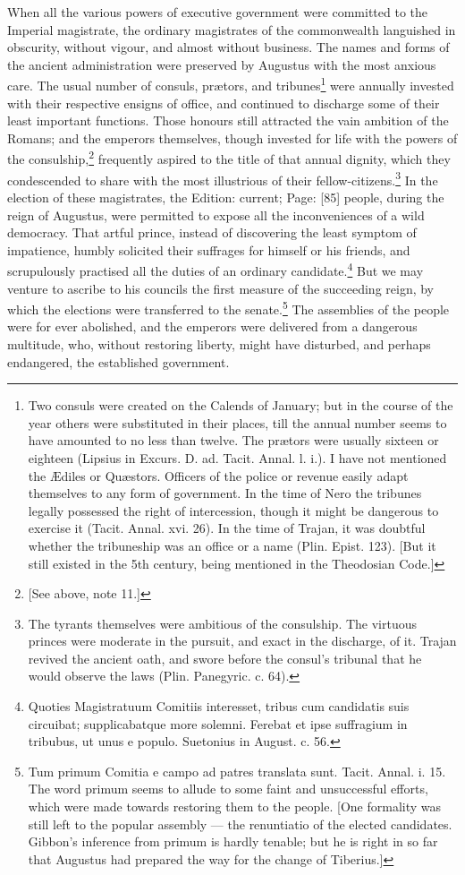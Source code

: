 When all the various powers of executive government were committed to the Imperial magistrate, the ordinary magistrates of the commonwealth languished in obscurity, without vigour, and almost without business. The names and forms of the ancient administration were preserved by Augustus with the most anxious care. The usual number of consuls, prætors, and tribunes\footnote{Two consuls were created on the Calends of January; but in the course of the year others were substituted in their places, till the annual number seems to have amounted to no less than twelve. The prætors were usually sixteen or eighteen (Lipsius in Excurs. D. ad. Tacit. Annal. l. i.). I have not mentioned the Ædiles or Quæstors. Officers of the police or revenue easily adapt themselves to any form of government. In the time of Nero the tribunes legally possessed the right of intercession, though it might be dangerous to exercise it (Tacit. Annal. xvi. 26). In the time of Trajan, it was doubtful whether the tribuneship was an office or a name (Plin. Epist. 123). [But it still existed in the 5th century, being mentioned in the Theodosian Code.]} were annually invested with their respective ensigns of office, and continued to discharge some of their least important functions. Those honours still attracted the vain ambition of the Romans; and the emperors themselves, though invested for life with the powers of the consulship,\footnote{[See above, note 11.]} frequently aspired to the title of that annual dignity, which they condescended to share with the most illustrious of their fellow-citizens.\footnote{The tyrants themselves were ambitious of the consulship. The virtuous princes were moderate in the pursuit, and exact in the discharge, of it. Trajan revived the ancient oath, and swore before the consul\texthebrew{}’s tribunal that he would observe the laws (Plin. Panegyric. c. 64).} In the election of these magistrates, the Edition: current; Page: [85] people, during the reign of Augustus, were permitted to expose all the inconveniences of a wild democracy. That artful prince, instead of discovering the least symptom of impatience, humbly solicited their suffrages for himself or his friends, and scrupulously practised all the duties of an ordinary candidate.\footnote{Quoties Magistratuum Comitiis interesset, tribus cum candidatis suis circuibat; supplicabatque more solemni. Ferebat et ipse suffragium in tribubus, ut unus e populo. Suetonius in August. c. 56.} But we may venture to ascribe to his councils the first measure of the succeeding reign, by which the elections were transferred to the senate.\footnote{Tum primum Comitia e campo ad patres translata sunt. Tacit. Annal. i. 15. The word primum seems to allude to some faint and unsuccessful efforts, which were made towards restoring them to the people. [One formality was still left to the popular assembly \texthebrew{—} the renuntiatio of the elected candidates. Gibbon\texthebrew{}’s inference from primum is hardly tenable; but he is right in so far that Augustus had prepared the way for the change of Tiberius.]} The assemblies of the people were for ever abolished, and the emperors were delivered from a dangerous multitude, who, without restoring liberty, might have disturbed, and perhaps endangered, the established government.

